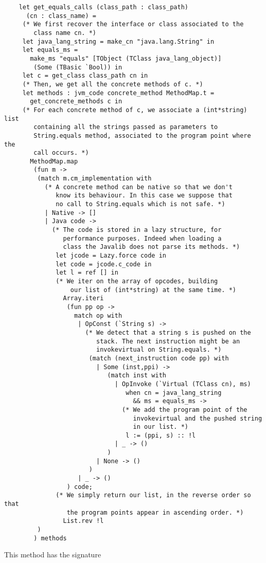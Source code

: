 \documentclass{article}
\begin{document}
\begin{verbatim}
    let get_equals_calls (class_path : class_path)
      (cn : class_name) =
     (* We first recover the interface or class associated to the
        class name cn. *)
     let java_lang_string = make_cn "java.lang.String" in
     let equals_ms =
       make_ms "equals" [TObject (TClass java_lang_object)]
        (Some (TBasic `Bool)) in
     let c = get_class class_path cn in
     (* Then, we get all the concrete methods of c. *)
     let methods : jvm_code concrete_method MethodMap.t =
       get_concrete_methods c in
     (* For each concrete method of c, we associate a (int*string) list
        containing all the strings passed as parameters to
        String.equals method, associated to the program point where the
        call occurs. *)
       MethodMap.map
        (fun m ->
         (match m.cm_implementation with
           (* A concrete method can be native so that we don't
              know its behaviour. In this case we suppose that
              no call to String.equals which is not safe. *)
           | Native -> []
           | Java code ->
             (* The code is stored in a lazy structure, for
                performance purposes. Indeed when loading a
                class the Javalib does not parse its methods. *)
              let jcode = Lazy.force code in
              let code = jcode.c_code in
              let l = ref [] in
              (* We iter on the array of opcodes, building
                  our list of (int*string) at the same time. *)
                Array.iteri
                 (fun pp op ->
                   match op with
                    | OpConst (`String s) ->
                      (* We detect that a string s is pushed on the
                         stack. The next instruction might be an
                         invokevirtual on String.equals. *)
                       (match (next_instruction code pp) with
                         | Some (inst,ppi) ->
                            (match inst with
                              | OpInvoke (`Virtual (TClass cn), ms)
                                 when cn = java_lang_string
                                   && ms = equals_ms ->
                                (* We add the program point of the
                                   invokevirtual and the pushed string
                                   in our list. *)
                                 l := (ppi, s) :: !l
                              | _ -> ()
                            )
                         | None -> ()
                       )
                    | _ -> ()
                 ) code;
              (* We simply return our list, in the reverse order so that
                 the program points appear in ascending order. *)
                List.rev !l
         )
        ) methods
\end{verbatim}
This method has the signature
\end{document}
